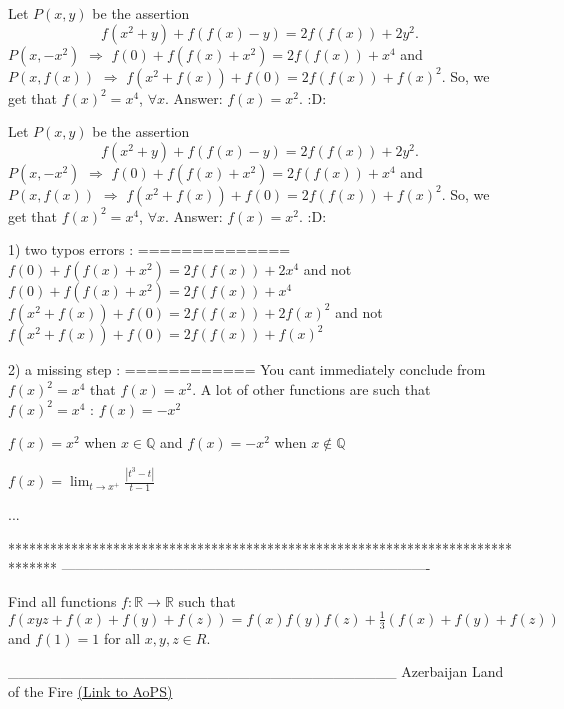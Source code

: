 \begin{solution}
	Let $P(x,y)$ be the assertion 
\[ f(x^2+y)+f(f(x)-y)=2f(f(x))+2y^2 .\]
$P(x,-x^2)$ $ \Rightarrow $ $f(0)+f(f(x)+x^2)=2f(f(x))+x^4$ and  $P(x,f(x))$ $ \Rightarrow $  $ f(x^2+f(x))+f(0)=2f(f(x))+f(x)^2 $.
So,  we get that  $ f(x)^2=x^4 $,  $ \forall x .$
Answer: $f(x)=x^2$.  :D:
\end{solution}



\begin{solution}
	\begin{tcolorbox}Let $P(x,y)$ be the assertion 
\[ f(x^2+y)+f(f(x)-y)=2f(f(x))+2y^2 .\]
$P(x,-x^2)$ $ \Rightarrow $ $f(0)+f(f(x)+x^2)=2f(f(x))+x^4$ and  $P(x,f(x))$ $ \Rightarrow $  $ f(x^2+f(x))+f(0)=2f(f(x))+f(x)^2 $.
So,  we get that  $ f(x)^2=x^4 $,  $ \forall x .$
Answer: $f(x)=x^2$.  :D:\end{tcolorbox}

1) two typos errors : 
==============
$f(0)+f(f(x)+x^2)=2f(f(x))+2x^4$  and not $f(0)+f(f(x)+x^2)=2f(f(x))+x^4$ 
$ f(x^2+f(x))+f(0)=2f(f(x))+2f(x)^2 $ and not $ f(x^2+f(x))+f(0)=2f(f(x))+f(x)^2 $

2) a missing step :
============
You cant immediately conclude from $f(x)^2=x^4$ that $f(x)=x^2$. A lot of other functions are such that $f(x)^2=x^4$ :
$f(x)=-x^2$

$f(x)=x^2$ when $x\in\mathbb Q$ and $f(x)=-x^2$ when $x\notin\mathbb Q$

$f(x)=\lim_{t\to x^+}\frac{|t^3-t|}{t-1}$

...
\end{solution}
*******************************************************************************
-------------------------------------------------------------------------------

\begin{problem}
	Find all functions $f: \mathbb{R}\to\mathbb{R}$ such that $f(xyz+f(x)+f(y)+f(z))=f(x)f(y)f(z)+\frac{1}{3}(f(x)+f(y)+f(z))$ and $f(1)=1$ for all $x,y,z{\in}R$.

_____________________________________
Azerbaijan Land of the Fire 
	\flushright \href{https://artofproblemsolving.com/community/c6h532137}{(Link to AoPS)}
\end{problem}



